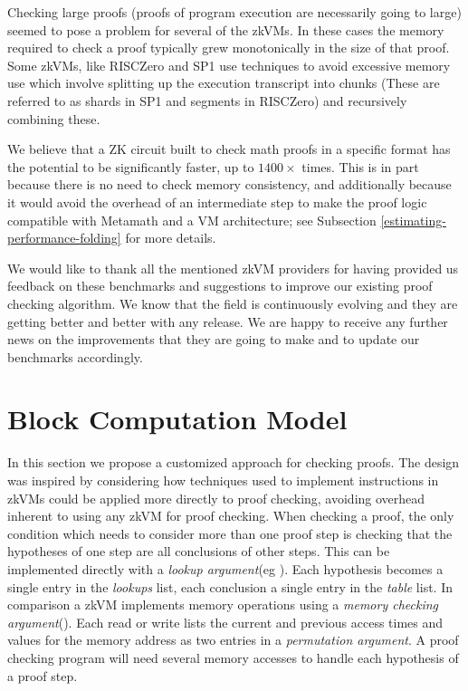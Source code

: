 \documentclass{article}
\theoremstyle{plain}
\theoremstyle{definition}
\begin{document}
Checking large proofs (proofs of program execution are necessarily going to large) seemed to pose a problem for several of the zkVMs. In these cases the memory required to check a proof typically grew monotonically in the size of that proof. Some zkVMs, like RISCZero and SP1 use techniques to avoid excessive memory use which involve splitting up the execution transcript into chunks (These are referred to as shards in SP1 and segments in RISCZero) and recursively combining these.  

We believe that a ZK circuit built to check math proofs in a specific format has the potential to be significantly faster, up to $1400 \times$ times. This is in part because there is no need to check memory consistency, and additionally because it would avoid the overhead of an intermediate step to make the proof logic compatible with Metamath and a VM architecture; see Subsection \ref{estimating-performance-folding} for more details.

We would like to thank all the mentioned zkVM providers for having provided us feedback on these benchmarks and suggestions to improve our existing proof checking algorithm. We know that the field is continuously evolving and they are getting better and better with any release. We are happy to receive any further news on the improvements that they are going to make and to update our benchmarks accordingly.


\section{Block Computation Model} \label{sec:block_model}
In this section we propose a customized approach for checking proofs.
The design was inspired by considering how techniques used to implement instructions in zkVMs
could be applied more directly to proof checking, avoiding
overhead inherent to using any zkVM for proof checking.
When checking a proof, the only condition which needs to consider more than one proof step is checking that the hypotheses of one step are all conclusions of other steps.
This can be implemented directly with a \emph{lookup argument}(eg \cite{logup,Lasso}).
Each hypothesis becomes a single entry in the \emph{lookups} list, each conclusion a single entry in the \emph{table} list.
In comparison a zkVM implements memory operations using a \emph{memory checking argument}(\cite{BCGT13-ram}).
Each read or write lists the current and previous access times and values for the memory address as two entries in a \emph{permutation argument}.
A proof checking program will need several memory accesses to handle each hypothesis of a proof step.
\end{document}
